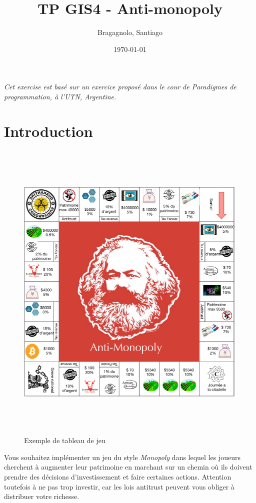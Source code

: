 \documentclass[12pt]{article}
\author{
        Bragagnolo, Santiago
}
\title{TP GIS4 - Anti-monopoly}
\date{\today}
\begin{document}
\maketitle
\emph{Cet exercise est basé sur un exercice proposé dans le cour de Paradigmes de programmation, à l'UTN, Argentine.}

\section{Introduction}

\begin{figure}
\includegraphics[width=15cm,height=15cm,keepaspectratio]{figures/board.pdf}
\caption{Exemple de tableau de jeu}
\end{figure}



	Vous souhaitez implémenter un jeu du style \emph{Monopoly} dans lequel les joueurs cherchent
à augmenter leur patrimoine en marchant sur un chemin où ils doivent prendre des décisions 
d'investissement et faire certaines actions. Attention toutefois à ne pas trop investir, car 
les lois antitrust peuvent vous obliger à distribuer votre richesse.
\end{document}
